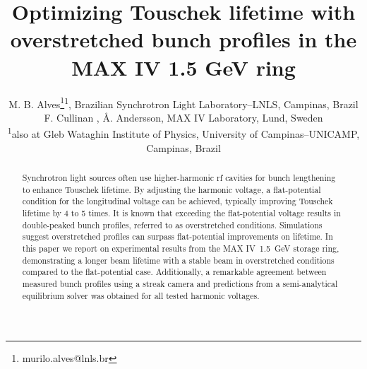 \documentclass[a4paper,
               ]{jacow}
\begin{document}
\title{Optimizing Touschek lifetime with overstretched bunch profiles in the MAX IV 1.5 GeV ring}

\author{M. B. Alves\thanks{murilo.alves@lnls.br}\textsuperscript{1}, Brazilian Synchrotron Light Laboratory--LNLS, Campinas, Brazil\\
		F. Cullinan , Å. Andersson, MAX IV Laboratory, Lund, Sweden\\
		\textsuperscript{1}also at Gleb Wataghin Institute of Physics, University of Campinas--UNICAMP, Campinas, Brazil}
\maketitle

%
\begin{abstract}
Synchrotron light sources often use higher-harmonic rf cavities for bunch lengthening to enhance Touschek lifetime. By adjusting the harmonic voltage, a flat-potential condition for the longitudinal voltage can be achieved, typically improving Touschek lifetime by 4 to 5 times. It is known that exceeding the flat-potential voltage results in double-peaked bunch profiles, referred to as overstretched conditions. Simulations suggest overstretched profiles can surpass flat-potential improvements on lifetime. In this paper we report on experimental results from the MAX IV~\SI{1.5}{\giga\electronvolt} storage ring, demonstrating a longer beam lifetime with a stable beam in overstretched conditions compared to the flat-potential case. Additionally, a remarkable agreement between measured bunch profiles using a streak camera and predictions from a semi-analytical equilibrium solver was obtained for all tested harmonic voltages.
\end{abstract}
\end{document}
